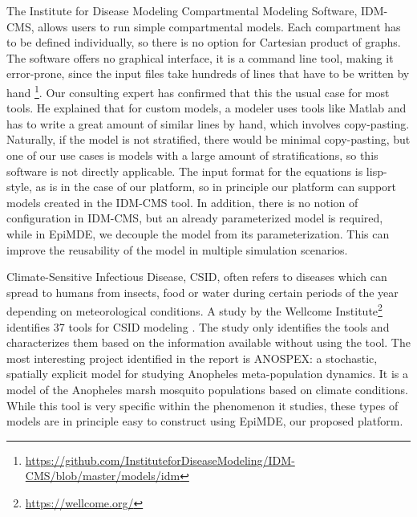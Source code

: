 The Institute for Disease Modeling Compartmental Modeling Software, IDM-CMS, allows users to run simple compartmental models. Each compartment has to be defined individually, so there is no option for Cartesian product of graphs. The software offers no graphical interface, it is a command line tool, making it error-prone, since the input files take hundreds of lines that have to be written by hand \footnote{\url{https://github.com/InstituteforDiseaseModeling/IDM-CMS/blob/master/models/idm}}. Our consulting expert has confirmed that this the usual case for most tools. He explained that for custom models, a modeler uses tools like Matlab and has to write a great amount of similar lines by hand, which involves copy-pasting. Naturally, if the model is not stratified, there would be minimal copy-pasting, but one of our use cases is models with a large amount of stratifications, so this software is not directly applicable. The input format for the equations is lisp-style, as is in the case of our platform, so in principle our platform can support models created in the IDM-CMS tool. In addition, there is no notion of configuration in IDM-CMS, but an already parameterized model is required, while in EpiMDE, we decouple the model from its parameterization. This can improve the reusability of the model in multiple simulation scenarios.

Climate-Sensitive Infectious Disease, CSID, often refers to diseases which can spread to humans from insects, food or water during certain periods of the year depending on meteorological conditions. A study by the Wellcome Institute\footnote{\url{https://wellcome.org/}} identifies 37 tools for CSID modeling \cite{Wellcome2022}. The study only identifies the tools and characterizes them based on the information available without using the tool. The most interesting project identified in the report is ANOSPEX: a stochastic, spatially explicit model for studying Anopheles meta-population dynamics. It is a model of the Anopheles marsh mosquito populations based on climate conditions. While this tool is very specific within the phenomenon it studies, these types of models are in principle easy to construct using EpiMDE, our proposed platform.

